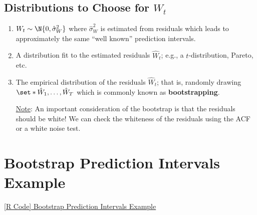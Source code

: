 \subsection*{Distributions to Choose for $ W_t $}
\begin{enumerate}[(1)]
      \item $ W_t \sim \N{0,\hat{\sigma}_W^2} $ where $ \hat{\sigma}_W^2 $ is estimated from residuals which
            leads to approximately the same ``well known'' prediction intervals.
      \item A distribution fit to the estimated residuals $ \hat{W}_t $; e.g., a $ t $-distribution,
            Pareto, etc.
      \item The empirical distribution of the residuals $ \hat{W}_t $; that is,
            randomly drawing $ \set*{\hat{W}_1,\ldots,\hat{W}_{T}} $ which is commonly known
            as \textbf{bootstrapping}.

            \underline{Note}: An important consideration of the bootstrap is that the residuals should be white!
            We can check the whiteness of the residuals using the ACF or a white noise test.
\end{enumerate}
\section{Bootstrap Prediction Intervals Example}
\href{https://github.com/Hextical/university-notes/blob/master/year-3/semester-2/STAT%20443/code/6.6%20-%20Bootstrap%20Prediction%20Intervals%20Example.R}{[R Code] Bootstrap Prediction Intervals Example}
